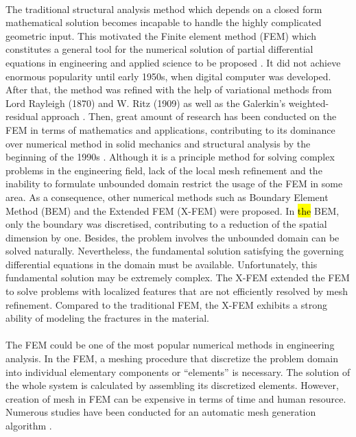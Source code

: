 \paragraph{}
The traditional structural analysis method which depends on a closed form mathematical solution becomes incapable to handle the highly complicated geometric input.
This motivated the Finite element method (FEM) which constitutes a general tool for the numerical solution of partial differential equations in engineering and applied science to be proposed \citep{Ucb2010}.
It did not achieve enormous popularity until early 1950s, when digital computer was developed.
After that, the method was refined with the help of variational methods from Lord Rayleigh (1870) and W. Ritz (1909) as well as the Galerkin's weighted-residual approach \citep{Fel1994}.
Then, great amount of research has been conducted on the FEM in terms of mathematics and applications, contributing to its dominance over numerical method in solid mechanics and structural analysis by the beginning of the 1990s \citep{Clo1980}.
Although it is a principle method for solving complex problems in the engineering field, lack of the local mesh refinement and the inability to formulate unbounded domain restrict the usage of the FEM in some area.
As a consequence, other numerical methods such as Boundary Element Method (BEM) \citep{Li2011,WARDLE1984525} and the Extended FEM (X-FEM) \citep{Moes1999} were proposed.
In \hl{the} BEM, only the boundary was discretised, contributing to a reduction of the spatial dimension by one.
Besides, the problem involves the unbounded domain can be solved naturally.
Nevertheless, the fundamental solution satisfying the governing differential equations in the domain must be available.
Unfortunately, this fundamental solution may be extremely complex.
The X-FEM extended the FEM to solve problems with localized features that are not efficiently resolved by mesh refinement.
Compared to the traditional FEM, the X-FEM exhibits a strong ability of modeling the fractures in the material.

\paragraph{}
The FEM could be one of the most popular numerical methods in engineering analysis.
In the FEM, a meshing procedure that discretize the problem domain into individual elementary components or ``elements'' is necessary.
The solution of the whole system is calculated by assembling its discretized elements.
However, creation of mesh in FEM can be expensive in terms of time and human resource.
Numerous studies have been conducted for an automatic mesh generation algorithm \citep{owen2000,Blacker1993,doi:10.1002/fld.1650081003,doi:10.1093/comjnl/24.2.167}.

